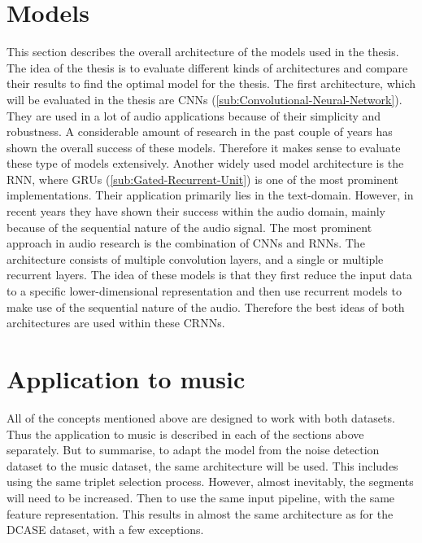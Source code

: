 \section{Models}
\label{sec:Models}
This section describes the overall architecture of the models used in the thesis. The idea of the thesis is to evaluate different kinds of architectures and compare their results to find the optimal model for the thesis.
\newline
\newline
The first architecture, which will be evaluated in the thesis are \glspl{CNN} (\ref{sub:Convolutional-Neural-Network}). They are used in a lot of audio applications because of their simplicity and robustness. A considerable amount of research in the past couple of years has shown the overall success of these models. Therefore it makes sense to evaluate these type of models extensively. 
\newline
\newline
Another widely used model architecture is the \gls{RNN}, where \glspl{GRU} (\ref{sub:Gated-Recurrent-Unit}) is one of the most prominent implementations. Their application primarily lies in the text-domain. However, in recent years they have shown their success within the audio domain, mainly because of the sequential nature of the audio signal.
\newline
\newline
The most prominent approach in audio research is the combination of \glspl{CNN} and \glspl{RNN}. The architecture consists of multiple convolution layers, and a single or multiple recurrent layers. The idea of these models is that they first reduce the input data to a specific lower-dimensional representation and then use recurrent models to make use of the sequential nature of the audio. Therefore the best ideas of both architectures are used within these \glspl{CRNN}.

\section{Application to music}
\label{sec:Application-Music}
All of the concepts mentioned above are designed to work with both datasets. Thus the application to music is described in each of the sections above separately. But to summarise, to adapt the model from the noise detection dataset to the music dataset, the same architecture will be used. This includes using the same triplet selection process. However, almost inevitably, the segments will need to be increased. Then to use the same input pipeline, with the same feature representation. This results in almost the same architecture as for the \gls{DCASE} dataset, with a few exceptions.

